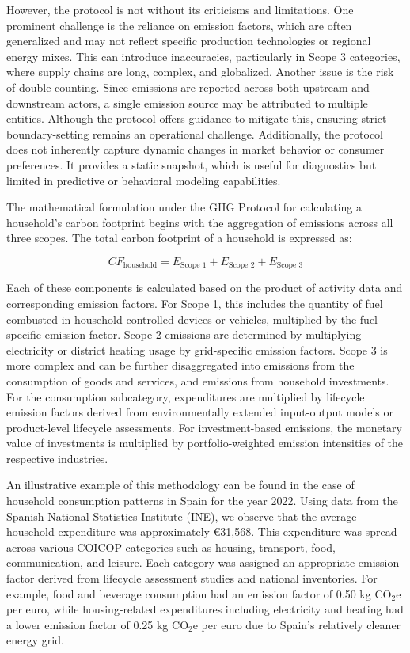\documentclass[12pt,a4paper]{article}%
\begin{document}
However, the protocol is not without its criticisms and limitations. One prominent challenge is the reliance on emission factors, which are often generalized and may not reflect specific production technologies or regional energy mixes. This can introduce inaccuracies, particularly in Scope 3 categories, where supply chains are long, complex, and globalized. Another issue is the risk of double counting. Since emissions are reported across both upstream and downstream actors, a single emission source may be attributed to multiple entities. Although the protocol offers guidance to mitigate this, ensuring strict boundary-setting remains an operational challenge. Additionally, the protocol does not inherently capture dynamic changes in market behavior or consumer preferences. It provides a static snapshot, which is useful for diagnostics but limited in predictive or behavioral modeling capabilities.

The mathematical formulation under the GHG Protocol for calculating a household’s carbon footprint begins with the aggregation of emissions across all three scopes. The total carbon footprint of a household is expressed as:

\begin{equation}
CF_{\text{household}} = E_{\text{Scope 1}} + E_{\text{Scope 2}} + E_{\text{Scope 3}}
\end{equation}

Each of these components is calculated based on the product of activity data and corresponding emission factors. For Scope 1, this includes the quantity of fuel combusted in household-controlled devices or vehicles, multiplied by the fuel-specific emission factor. Scope 2 emissions are determined by multiplying electricity or district heating usage by grid-specific emission factors. Scope 3 is more complex and can be further disaggregated into emissions from the consumption of goods and services, and emissions from household investments. For the consumption subcategory, expenditures are multiplied by lifecycle emission factors derived from environmentally extended input-output models or product-level lifecycle assessments. For investment-based emissions, the monetary value of investments is multiplied by portfolio-weighted emission intensities of the respective industries.

An illustrative example of this methodology can be found in the case of household consumption patterns in Spain for the year 2022. Using data from the Spanish National Statistics Institute (INE), we observe that the average household expenditure was approximately €31,568. This expenditure was spread across various COICOP categories such as housing, transport, food, communication, and leisure. Each category was assigned an appropriate emission factor derived from lifecycle assessment studies and national inventories. For example, food and beverage consumption had an emission factor of 0.50 kg CO$_2$e per euro, while housing-related expenditures including electricity and heating had a lower emission factor of 0.25 kg CO$_2$e per euro due to Spain’s relatively cleaner energy grid.
\end{document}
